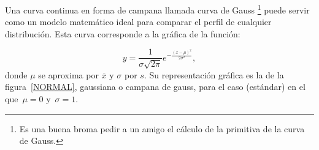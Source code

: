\documentclass[12pt]{report}
\begin{document}
Una curva continua en forma de campana llamada curva de Gauss \footnote{Es una buena broma pedir a un amigo el cálculo de la primitiva de la curva de Gauss.} puede servir como un modelo
matemático ideal para comparar el perfil de cualquier distribución. Esta curva
corresponde a la gráfica de la función:

$$y=\frac{1}{\sigma\sqrt{2\pi}} e^{-\frac{(x-\mu)^2}{2\sigma^2}},$$
donde  $\mu$ se aproxima por $\overline{x}$  y  $\sigma$ por $s$.
 Su representación gráfica es
la de la figura~\ref{NORMAL}, gaussiana o campana de gauss, para el caso (estándar) en el  que~$\mu=0$ y~$\sigma =1$.

\begin{figure}

\end{figure}
\end{document}
